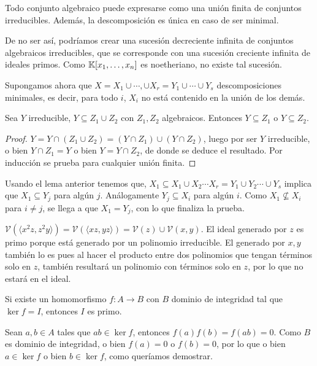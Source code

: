 \documentclass[ACGA.tex]{subfiles}
\begin{document}
\begin{prop}
Todo conjunto algebraico puede expresarse como una unión finita de conjuntos irreducibles. Además, la descomposición es única en caso de ser minimal.
\end{prop}
\begin{dem}
De no ser así, podríamos crear una sucesión decreciente infinita de conjuntos algebraicos irreducibles, que se corresponde con una sucesión creciente infinita de ideales primos. Como $\mathbb{K}[x_1,\dotsc,x_{n}]$ es noetheriano, no existe tal sucesión.

Supongamos ahora que $X=X_1\cup\cdots, \cup X_r=Y_1\cup\cdots\cup Y_s$ descomposiciones minimales, es decir, para todo $i$, $X_i$ no está contenido en la unión de los demás. 
\begin{lemma}
Sea $Y$ irreducible, $Y\subseteq Z_1\cup Z_2$ con $Z_1,Z_2$ algebraicos. Entonces $Y\subseteq Z_1$ o $Y\subseteq Z_2$. 
\end{lemma}
\begin{proof}
$Y=Y\cap( Z_1\cup Z_2)=(Y\cap Z_1)\cup(Y\cap Z_2)$, luego por ser $Y$ irreducible, o bien $Y\cap Z_1=Y$ o bien $Y=Y\cap Z_2$, de donde se deduce el resultado. Por inducción se prueba para cualquier unión finita.
\end{proof}
Usando el lema anterior tenemos que, $X_1\subseteq X_1\cup X_2\cdots X_r=Y_1\cup Y_2\cdots\cup Y_s$ implica que $X_1\subseteq Y_j$ para algún $j$. Análogamente $Y_j\subseteq X_i$ para algún $i$. Como $X_1\not\subseteq X_i$ para $i\neq j$, se llega a que $X_1=Y_j$, con lo que finaliza la prueba.


\end{dem}

\begin{ej}
$\mathcal{V}(\langle x^2z,z^2y\rangle)=\mathcal{V}(\langle xz,yz\rangle)=\mathcal{V}(z)\cup\mathcal{V}(x,y)$. El ideal generado por $z$ es primo porque está generado por un polinomio irreducible. El generado por $x,y$ también lo es pues al hacer el producto entre dos polinomios que tengan términos solo en $z$, también resultará un polinomio con términos solo en $z$, por lo que no estará en el ideal.
\end{ej}

\begin{prop}
Si existe un homomorfismo $f:A\to B$ con $B$ dominio de integridad tal que $\ker{f}=I$, entonces $I$ es primo.
\end{prop}

\begin{dem}
Sean $a,b\in A$ tales que $ab\in\ker{f}$, entonces $f(a)f(b)=f(ab)=0$. Como $B$ es dominio de integridad, o bien $f(a)=0$ o $f(b)=0$, por lo que o bien $a\in\ker{f}$ o bien $b\in\ker{f}$, como queríamos demostrar.
\end{dem}
\end{document}
